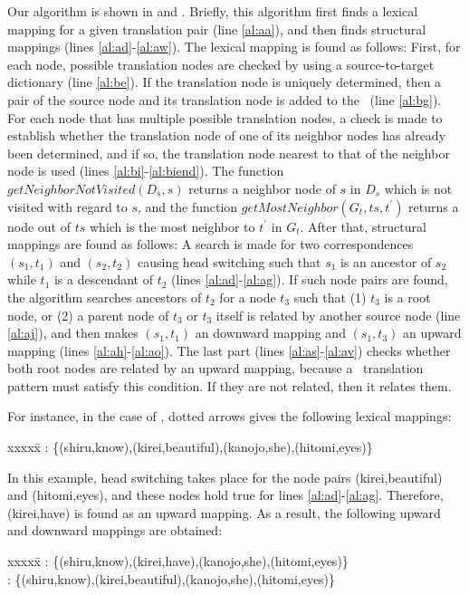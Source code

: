 Our algorithm is shown in  and . 
Briefly, this algorithm first finds a lexical mapping for a given translation
pair (line \ref{al:aa}), and then finds structural mappings (lines
\ref{al:ad}-\ref{al:aw}). The lexical mapping is found as follows: First, for
each node, possible translation nodes are checked by using a source-to-target
dictionary (line \ref{al:be}). If the translation node is uniquely determined,
then a pair of the source node and its translation node is added to the \ML\
(line \ref{al:bg}). For each node that has multiple possible translation
nodes, a check is made to establish whether the translation node of one of its
neighbor nodes has already been determined, and if so, the translation node
nearest to that of the neighbor node is used (lines
\ref{al:bi}-\ref{al:biend}). The function $getNeighborNotVisited(D_s,s)$
returns a neighbor node of $s$ in $D_s$ which is not visited with regard to
$s$, and the function $getMostNeighbor(G_t,ts,t^{\prime})$ returns a node out
of $ts$ which is the most neighbor to $t^{\prime}$ in $G_t$.  After that,
structural mappings are found as follows: A search is made for two
correspondences $(s_1,t_1)$ and $(s_2,t_2)$ causing head switching such that
$s_1$ is an ancestor of $s_2$ while $t_1$ is a descendant of $t_2$ (lines
\ref{al:ad}-\ref{al:ag}). If such node pairs are found, the algorithm searches
ancestors of $t_2$ for a node $t_3$ such that (1) $t_3$ is a root node, or (2)
a parent node of $t_3$ or $t_3$ itself is related by another source node (line
\ref{al:aj}), and then makes $(s_1,t_1)$ an downward mapping and $(s_1,t_3)$
an upward mapping (lines
\ref{al:ah}-\ref{al:ao}). The last part (lines \ref{al:as}-\ref{al:av}) checks
whether both root nodes are related by an upward mapping, because a \SimTran\
translation pattern must satisfy this condition. If they are not related, then
it relates them.

For instance, in the case of , dotted arrows
gives the following lexical mappings: 
\begin{tabbing}
xxxxx\=\+\kill
\ML: \{(shiru,know),(kirei,beautiful),(kanojo,she),(hitomi,eyes)\} 
\end{tabbing}
In this example, head switching takes place for the node pairs
(kirei,beautiful) and (hitomi,eyes), and these nodes hold true for lines
\ref{al:ad}-\ref{al:ag}. Therefore, (kirei,have) is found as an upward
mapping. As a result, the following upward and downward mappings are obtained:
\begin{tabbing}
xxxxx\=\+\kill
\Mup: \{(shiru,know),(kirei,have),(kanojo,she),(hitomi,eyes)\} \\
\Mdw: \{(shiru,know),(kirei,beautiful),(kanojo,she),(hitomi,eyes)\} 
\end{tabbing}

